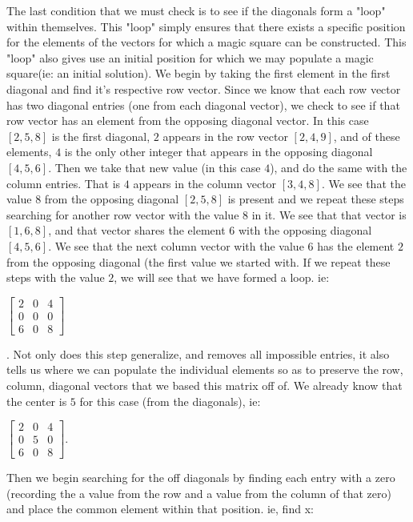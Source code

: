 \documentclass{article}
\begin{document}
    The last condition that we must check is to see if the diagonals form a "loop" within themselves. This "loop" simply ensures that there exists a specific position for the elements of the vectors for which a magic square can be constructed. This "loop" also gives use an initial position for which we may populate a magic square(ie: an initial solution). We begin by taking the first element in the first diagonal and find it's respective row vector. Since we know that each row vector has two diagonal entries (one from each diagonal vector), we check to see if that row vector has an element from the opposing diagonal vector. In this case $[2, 5, 8]$ is the first diagonal, $2$ appears in the row vector $[2, 4, 9]$, and of these elements, $4$ is the only other integer that appears in the opposing diagonal $[4, 5, 6]$. Then we take that new value (in this case $4$), and do the same with the column entries. That is $4$ appears in the column vector $[3, 4, 8]$. We see that the value 8 from the opposing diagonal $[2, 5, 8]$ is present and we repeat these steps searching for another row vector with the value 8 in it. We see that that vector is $[1, 6, 8]$, and that vector shares the element $6$ with the opposing diagonal $[4, 5, 6]$. We see that the next column vector with the value $6$ has the element $2$ from the opposing diagonal (the first value we started with. If we repeat these steps with the value $2$, we will see that we have formed a loop. ie:
    \begin{center}
        $\begin{bmatrix}
            2 & 0 & 4 \\
            0 & 0 & 0 \\
            6 & 0 & 8
        \end{bmatrix}$
    \end{center}.
    Not only does this step generalize, and removes all impossible entries, it also tells us where we can populate the individual elements so as to preserve the row, column, diagonal vectors that we based this matrix off of. We already know that the center is $5$ for this case (from the diagonals), ie:
    \begin{center}
        $\begin{bmatrix}
            2 & 0 & 4 \\
            0 & 5 & 0 \\
            6 & 0 & 8
        \end{bmatrix}$.
    \end{center}
    Then we begin searching for the off diagonals by finding each entry with a zero (recording the a value from the row and a value from the column of that zero) and place the common element within that position. ie, find x:
\end{document}
